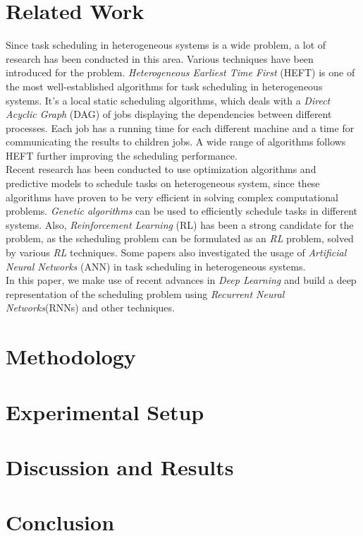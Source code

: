 \documentclass[twocolumn,11pt]{IEEEtran}
\begin{document}
\section{Related Work}

Since task scheduling in heterogeneous systems is a wide problem, a lot of research has been conducted in this area. Various techniques have been introduced for the problem. 
\emph{Heterogeneous Earliest Time First} (HEFT)\cite{993206} is one of the most well-established algorithms for task scheduling in heterogeneous systems. 
It's a local static scheduling algorithms, which deals with a \emph{Direct Acyclic Graph} (DAG) of jobs displaying the dependencies between different processes. Each job has a running time for each different machine and a time for communicating the results to children jobs. 
A wide range of algorithms\cite{inbook} follows HEFT further improving the scheduling performance. \\
Recent research has been conducted to use optimization algorithms and predictive models to schedule tasks on heterogeneous system, since these algorithms have proven to be very efficient in solving complex computational problems. 
\emph{Genetic algorithms}\cite{article2} can be used to efficiently schedule tasks in different systems. Also, \emph{Reinforcement Learning} (RL)\cite{ORHEAN2018292} has been a strong candidate for the problem, as the scheduling problem can be formulated as an \emph{RL} problem, solved by various \emph{RL} techniques. 
Some papers also investigated the usage of \emph{Artificial Neural Networks} (ANN)\cite{article3} in task scheduling in heterogeneous systems. \\ 
In this paper, we make use of recent advances in \emph{Deep Learning} and build a deep representation of the scheduling problem using \emph{Recurrent Neural Networks}(RNNs)\cite{chung2014empirical} and other techniques.

\section{Methodology}

\section{Experimental Setup}

\section{Discussion and Results}

\section{Conclusion}

\medskip



    
\end{document}

